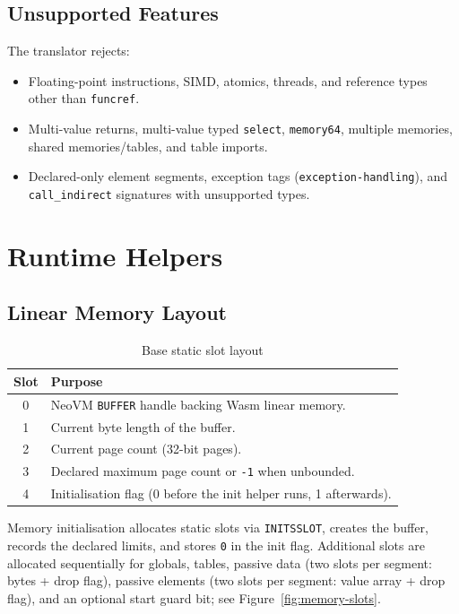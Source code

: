 \documentclass[11pt]{article}
\begin{document}
\subsection{Unsupported Features}
The translator rejects:
\begin{itemize}[nosep]
    \item Floating-point instructions, SIMD, atomics, threads, and reference types other than \texttt{funcref}.
    \item Multi-value returns, multi-value typed \texttt{select}, \texttt{memory64}, multiple memories, shared memories/tables, and table imports.
    \item Declared-only element segments, exception tags (\texttt{exception-handling}), and \texttt{call\_indirect} signatures with unsupported types.
\end{itemize}

\section{Runtime Helpers}
\subsection{Linear Memory Layout}
\begin{table}[htbp]
\centering
\begin{tabular}{@{}c p{10cm}@{}}
\toprule
Slot & Purpose \\
\midrule
0 & NeoVM \texttt{BUFFER} handle backing Wasm linear memory. \\
1 & Current byte length of the buffer. \\
2 & Current page count (32-bit pages). \\
3 & Declared maximum page count or \texttt{-1} when unbounded. \\
4 & Initialisation flag (0 before the init helper runs, 1 afterwards). \\
\bottomrule
\end{tabular}
\caption{Base static slot layout}
\end{table}
Memory initialisation allocates static slots via \texttt{INITSSLOT}, creates the buffer, records the declared limits, and stores \texttt{0} in the init flag. Additional slots are allocated sequentially for globals, tables, passive data (two slots per segment: bytes + drop flag), passive elements (two slots per segment: value array + drop flag), and an optional start guard bit; see Figure~\ref{fig:memory-slots}.
\end{document}
